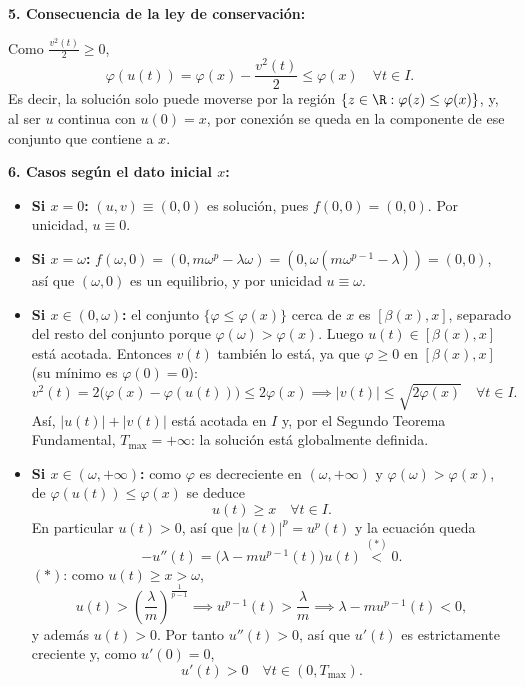 {    \textbf{5. Consecuencia de la ley de conservación:}

    Como $\frac{v^2(t)}{2} \ge 0$,
    \[
        \varphi(u(t)) = \varphi(x) - \frac{v^2(t)}{2} \le \varphi(x) \quad \forall t \in I.
    \]
    Es decir, la solución solo puede moverse por la región $\{ z \in \R : \varphi(z) \le \varphi(x) \}$, y, al ser $u$ continua con $u(0) = x$, por conexión se queda en la componente de ese conjunto que contiene a $x$.

    \textbf{6. Casos según el dato inicial $x$:}
    \begin{itemize}
        \item \textbf{Si $x = 0$:} $(u, v) \equiv (0, 0)$ es solución, pues $f(0, 0) = (0, 0)$. Por unicidad, $u \equiv 0$.

        \item \textbf{Si $x = \omega$:} $f(\omega, 0) = (0, m\omega^p - \lambda \omega) = (0, \omega(m\omega^{p-1} - \lambda)) = (0, 0)$, así que $(\omega, 0)$ es un equilibrio, y por unicidad $u \equiv \omega$.

        \item \textbf{Si $x \in (0, \omega)$:} el conjunto $\{ \varphi \le \varphi(x) \}$ cerca de $x$ es $[\beta(x), x]$, separado del resto del conjunto porque $\varphi(\omega) > \varphi(x)$. Luego $u(t) \in [\beta(x), x]$ está acotada. Entonces $v(t)$ también lo está, ya que $\varphi \ge 0$ en $[\beta(x), x]$ (su mínimo es $\varphi(0) = 0$):
        \[
            v^2(t) = 2 \big( \varphi(x) - \varphi(u(t)) \big) \le 2 \varphi(x) \implies |v(t)| \le \sqrt{2 \varphi(x)} \quad \forall t \in I.
        \]
        Así, $|u(t)| + |v(t)|$ está acotada en $I$ y, por el Segundo Teorema Fundamental, $T_{\max} = +\infty$: la solución está globalmente definida.

        \item \textbf{Si $x \in (\omega, +\infty)$:} como $\varphi$ es decreciente en $(\omega, +\infty)$ y $\varphi(\omega) > \varphi(x)$, de $\varphi(u(t)) \le \varphi(x)$ se deduce
        \[
            u(t) \ge x \quad \forall t \in I.
        \]
        En particular $u(t) > 0$, así que $|u(t)|^p = u^p(t)$ y la ecuación queda
        \[
            -u''(t) = \big( \lambda - m u^{p-1}(t) \big) u(t) \overset{(\ast)}{<} 0.
        \]
        $(\ast)$: como $u(t) \ge x > \omega$,
        \[
            u(t) > \left( \frac{\lambda}{m} \right)^{\frac{1}{p-1}} \implies u^{p-1}(t) > \frac{\lambda}{m} \implies \lambda - m u^{p-1}(t) < 0,
        \]
        y además $u(t) > 0$. Por tanto $u''(t) > 0$, así que $u'(t)$ es estrictamente creciente y, como $u'(0) = 0$,
        \[
            u'(t) > 0 \quad \forall t \in (0, T_{\max}).
        \]


\end{itemize}}
